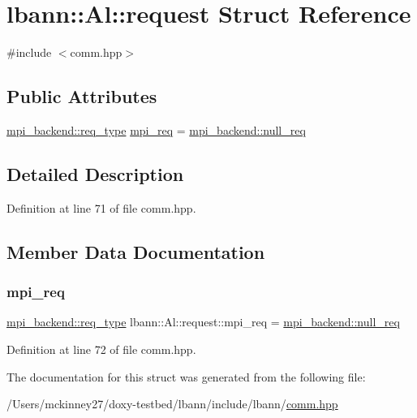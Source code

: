 \hypertarget{structlbann_1_1Al_1_1request}{}\section{lbann\+:\+:Al\+:\+:request Struct Reference}
\label{structlbann_1_1Al_1_1request}


{\ttfamily \#include $<$comm.\+hpp$>$}

\subsection*{Public Attributes}
\begin{DoxyCompactItemize}
\item 
\hyperlink{classlbann_1_1Al_1_1dummy__backend_a9386c505d856d41c37d23e4293c11f2f}{mpi\+\_\+backend\+::req\+\_\+type} \hyperlink{structlbann_1_1Al_1_1request_ac244ce26cf8ea6ebad799efa6ca39ba3}{mpi\+\_\+req} = \hyperlink{classlbann_1_1Al_1_1dummy__backend_a458ac4eb9f62b06984b4ef1b1eeb5851}{mpi\+\_\+backend\+::null\+\_\+req}
\end{DoxyCompactItemize}


\subsection{Detailed Description}


Definition at line 71 of file comm.\+hpp.



\subsection{Member Data Documentation}
\mbox{\label{structlbann_1_1Al_1_1request_ac244ce26cf8ea6ebad799efa6ca39ba3}} 
\subsubsection{\texorpdfstring{mpi\+\_\+req}{mpi\_req}}
{\footnotesize\ttfamily \hyperlink{classlbann_1_1Al_1_1dummy__backend_a9386c505d856d41c37d23e4293c11f2f}{mpi\+\_\+backend\+::req\+\_\+type} lbann\+::\+Al\+::request\+::mpi\+\_\+req = \hyperlink{classlbann_1_1Al_1_1dummy__backend_a458ac4eb9f62b06984b4ef1b1eeb5851}{mpi\+\_\+backend\+::null\+\_\+req}}



Definition at line 72 of file comm.\+hpp.



The documentation for this struct was generated from the following file\+:\begin{DoxyCompactItemize}
\item 
/\+Users/mckinney27/doxy-\/testbed/lbann/include/lbann/\hyperlink{comm_8hpp}{comm.\+hpp}\end{DoxyCompactItemize}
